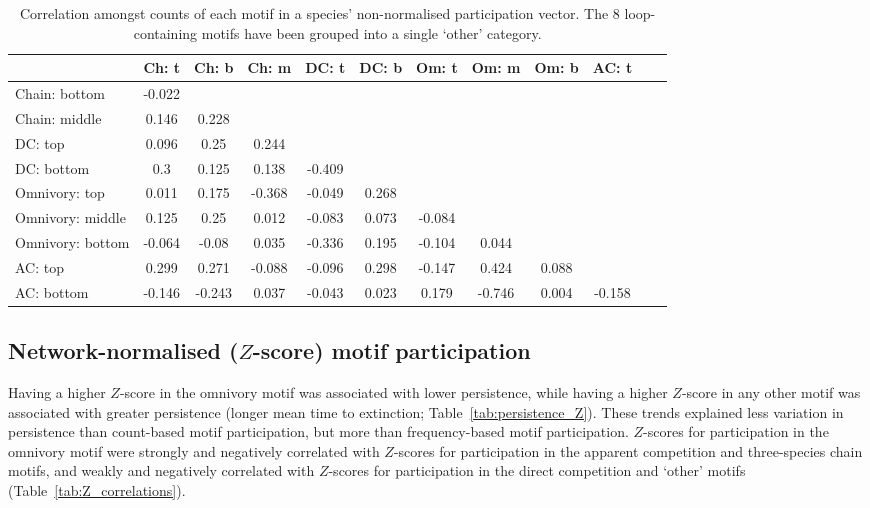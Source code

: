 \documentclass[12pt]{article}
\begin{document}
\begin{spacing}{2.0}
		\begin{table}[h!]
    		\caption{Correlation amongst counts of each motif in a species' non-normalised participation vector. The 8 loop-containing motifs have been grouped into a single `other' category.}
    		\label{tab:position_freq_correlations}
    		\footnotesize
    		\begin{tabular}{l | c c c c c c c c c c c}    
        		&	Ch: t	&	Ch: b	&	Ch: m	&	DC: t	&	DC: b	&	Om: t	&	Om: m	&	Om: b	&	AC: t	\\
        		\hline
                Chain: bottom	&	-0.022	&		&		&		&		&		&		&		&		\\
                Chain: middle	&	0.146	&	0.228	&		&		&		&		&		&		&		\\
                DC: top	&	0.096	&	0.25	&	0.244	&		&		&		&		&		&		\\
                DC: bottom	&	0.3	&	0.125	&	0.138	&	-0.409	&		&		&		&		&		\\
                Omnivory: top	&	0.011	&	0.175	&	-0.368	&	-0.049	&	0.268	&		&		&		&		\\
                Omnivory: middle	&	0.125	&	0.25	&	0.012	&	-0.083	&	0.073	&	-0.084	&		&		&		\\
                Omnivory: bottom	&	-0.064	&	-0.08	&	0.035	&	-0.336	&	0.195	&	-0.104	&	0.044	&		&		\\
                AC: top	&	0.299	&	0.271	&	-0.088	&	-0.096	&	0.298	&	-0.147	&	0.424	&	0.088	&		\\
                AC: bottom	&	-0.146	&	-0.243	&	0.037	&	-0.043	&	0.023	&	0.179	&	-0.746	&	0.004	&	-0.158	\\
                \hline
            \end{tabular}
            \end{table}


	\subsection*{Network-normalised ($Z$-score) motif participation}

		Having a higher $Z$-score in the omnivory motif was associated with lower persistence, while having a higher $Z$-score in any other motif was associated with greater persistence (longer mean time to extinction; Table~\ref{tab:persistence_Z}).
		These trends explained less variation in persistence than count-based motif participation, but more than frequency-based motif participation.
		$Z$-scores for participation in the omnivory motif were strongly and negatively correlated with $Z$-scores for participation in the apparent competition and three-species chain motifs, and weakly and negatively correlated with $Z$-scores for participation in the direct competition and `other' motifs (Table~\ref{tab:Z_correlations}).



\end{spacing}
\end{document}
